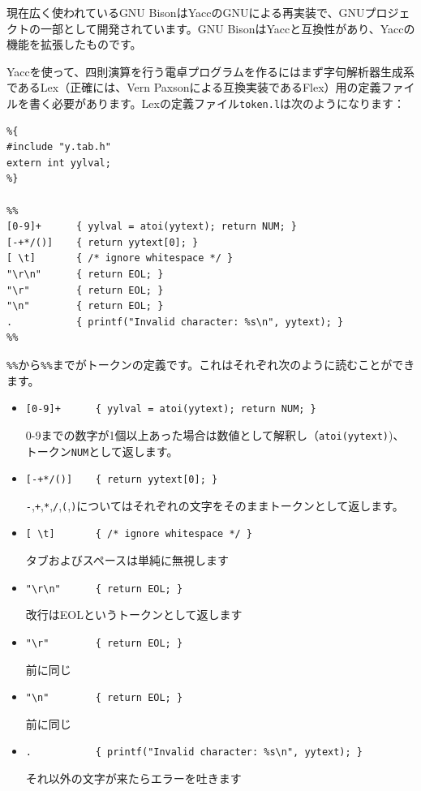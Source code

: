 現在広く使われているGNU
BisonはYaccのGNUによる再実装で、GNUプロジェクトの一部として開発されています。GNU
BisonはYaccと互換性があり、Yaccの機能を拡張したものです。

Yaccを使って、四則演算を行う電卓プログラムを作るにはまず字句解析器生成系であるLex（正確には、Vern
Paxsonによる互換実装であるFlex）用の定義ファイルを書く必要があります。Lexの定義ファイル\texttt{token.l}は次のようになります：

\begin{verbatim}
%{
#include "y.tab.h"
extern int yylval;
%}

%%
[0-9]+      { yylval = atoi(yytext); return NUM; }
[-+*/()]    { return yytext[0]; }
[ \t]       { /* ignore whitespace */ }
"\r\n"      { return EOL; }
"\r"        { return EOL; }
"\n"        { return EOL; }
.           { printf("Invalid character: %s\n", yytext); }
%%
\end{verbatim}

\texttt{\%\%}から\texttt{\%\%}までがトークンの定義です。これはそれぞれ次のように読むことができます。

\begin{itemize}
\item
  \texttt{{[}0-9{]}+\ \ \ \ \ \ \{\ yylval\ =\ atoi(yytext);\ return\ NUM;\ \}}

  0-9までの数字が1個以上あった場合は数値として解釈し（\texttt{atoi(yytext)})、トークン\texttt{NUM}として返します。
\item
  \texttt{{[}-+*/(){]}\ \ \ \ \{\ return\ yytext{[}0{]};\ \}}

  \texttt{-},\texttt{+},\texttt{*},\texttt{/},\texttt{(},\texttt{)}についてはそれぞれの文字をそのままトークンとして返します。
\item
  \texttt{{[}\ \textbackslash{}t{]}\ \ \ \ \ \ \ \{\ /*\ ignore\ whitespace\ */\ \}}

  タブおよびスペースは単純に無視します
\item
  \texttt{"\textbackslash{}r\textbackslash{}n"\ \ \ \ \ \ \{\ return\ EOL;\ \}}

  改行はEOLというトークンとして返します
\item
  \texttt{"\textbackslash{}r"\ \ \ \ \ \ \ \ \{\ return\ EOL;\ \}}

  前に同じ
\item
  \texttt{"\textbackslash{}n"\ \ \ \ \ \ \ \ \{\ return\ EOL;\ \}}

  前に同じ
\item
  \texttt{.\ \ \ \ \ \ \ \ \ \ \ \{\ printf("Invalid\ character:\ \%s\textbackslash{}n",\ yytext);\ \}}

  それ以外の文字が来たらエラーを吐きます
\end{itemize}

